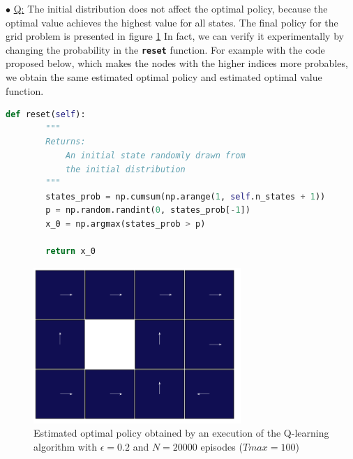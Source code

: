 \documentclass[a4paper, 11pt]{article}
\newcounter{cquestion}
\renewcommand{\thecquestion}{\arabic{cquestion}}
\newenvironment{question}
{\par \vspace{0.5em} \noindent \stepcounter{cquestion} \hspace{-1em}
 $\bullet$ \underline{Q\thecquestion :}}
{}
\newcommand{\pfun}[1]{{\textbf{\texttt{#1}}}}
\begin{document}
\clearpage
\begin{question}
  The initial distribution does not affect the optimal policy, because
  the optimal value achieves the highest value for all states.  The
  final policy for the grid problem is presented in figure
  \ref{fig:final-policy} In fact, we can verify it experimentally by
  changing the probability in the \pfun{reset} function.  For example
  with the code proposed below, which makes the nodes with the higher
  indices more probables, we obtain the same estimated optimal
  policy and estimated optimal value function.

  \begin{lstlisting}[language=Python]
    def reset(self):
        """
        Returns:
            An initial state randomly drawn from
            the initial distribution
        """
        states_prob = np.cumsum(np.arange(1, self.n_states + 1))
        p = np.random.randint(0, states_prob[-1])
        x_0 = np.argmax(states_prob > p)

        return x_0
  \end{lstlisting}


  \begin{figure}[h]
    \centering
    \includegraphics[width=0.7\textwidth]{final_policy}
    \caption{Estimated optimal policy obtained by an execution of the
      Q-learning algorithm with $\epsilon = 0.2$ and $N = 20000$
      episodes ($Tmax = 100$)}\label{fig:final-policy}
  \end{figure}


\end{question}
\end{document}
